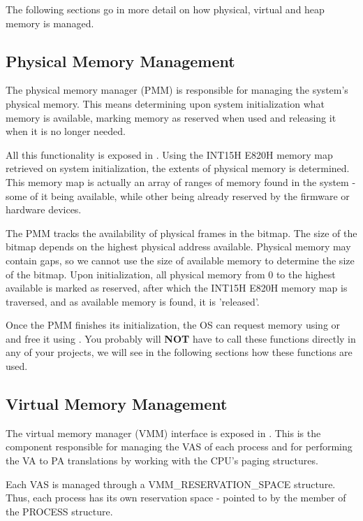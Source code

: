 \begin{appendices}
The following sections go in more detail on how physical, virtual and heap memory is managed.

\subsection{Physical Memory Management}

The physical memory manager (PMM) is responsible for managing the system's physical memory. This
means determining upon system initialization what memory is available, marking memory as reserved
when used and releasing it when it is no longer needed.

All this functionality is exposed in . Using the INT15H E820H memory map retrieved on
system initialization, the extents of physical memory is determined. This memory map is actually an
array of ranges of memory found in the system - some of it being available, while other being already
reserved by the firmware or hardware devices.

The PMM tracks the availability of physical frames in the  bitmap.
The size of the bitmap depends on the highest physical address available. Physical memory may 
contain gaps, so we cannot use the size of available memory to determine the size of the bitmap.
Upon initialization, all physical memory from 0 to the highest available is marked as reserved, after
which the INT15H E820H memory map is traversed, and as available memory is found, it is 'released'.

Once the PMM finishes its initialization, the OS can request memory using  or
 and free it using . You probably will \textbf{NOT}
have to call these functions directly in any of your projects, we will see in the following sections
how these functions are used.

\subsection{Virtual Memory Management}
\label{sect:VMM}

The virtual memory manager (VMM) interface is exposed in . This is the component
responsible for managing the VAS of each process and for performing the VA to PA translations by
working with the CPU's paging structures.

Each VAS is managed through a VMM\_RESERVATION\_SPACE structure. Thus, each process has its own
reservation space - pointed to by the  member of the PROCESS structure.


\end{appendices}
